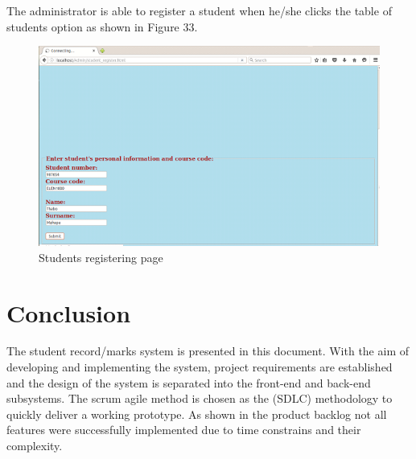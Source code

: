 \documentclass[10pt,onecolumn]{MainDocument}
\begin{document}
The administrator is able to register a student when he/she clicks the table of students option as shown in Figure 33. 


\begin{center}
\begin{figure}[h]
\centering
\includegraphics[trim = {0 0cm 0cm 0cm},clip, scale=1]{RegisteringStudents}
\caption{Students registering page}
\end{figure}
\end{center}


\newpage
\clearpage

\section{Conclusion}

The student record/marks system is presented in this document. With the aim of developing and implementing the system, project requirements are established and the design of the system is separated into the front-end and back-end subsystems. The scrum agile method is chosen as the (SDLC) methodology to quickly deliver a working prototype. As shown in the product backlog not all features were successfully implemented due to time constrains and their complexity.   

\newpage



\end{document}
